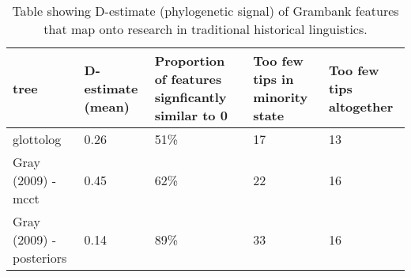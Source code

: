 \begin{table}[ht]
\centering
\begin{tabular}{p{4cm}p{2cm}p{3.5cm}p{2.5cm}p{2.5cm}}
  \hline
tree & D-estimate (mean) & Proportion of features signficantly similar to 0 & Too few tips in minority state & Too few tips altogether \\ 
  \hline
glottolog & 0.26 & 51\% &  17 & 13 \\ 
  Gray (2009) - mcct & 0.45 & 62\% &  22 & 16 \\ 
  Gray (2009) - posteriors & 0.14 & 89\% &  33 & 16 \\ 
   \hline
\end{tabular}
\caption{Table showing D-estimate (phylogenetic signal) of Grambank features that map onto research in traditional historical linguistics.} 
\label{d_estimate_summary}
\end{table}
